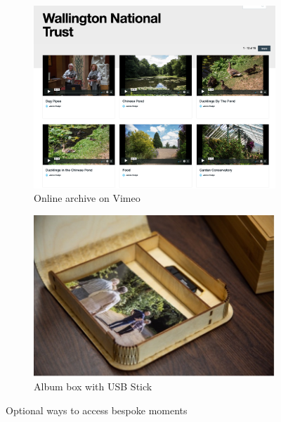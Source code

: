 \begin{figure}
\centering
\begin{subfigure}{.5\textwidth}
  \centering
  \includegraphics[width=.8\linewidth]{Images/ChapterFour/VimeoWebsite.png}
  \caption{Online archive on Vimeo}
  \label{fig:onlineArchive}
\end{subfigure}%
\begin{subfigure}{.5\textwidth}
  \centering
  \includegraphics[width=.8\linewidth]{Images/ChapterFour/InsidePhotoAlbum.jpg}
  \caption{Album box with USB Stick}
  \label{fig:AlbumBox}
\end{subfigure}
\caption{Optional ways to access bespoke moments}
\label{fig:OptionalMoments}
\end{figure}

